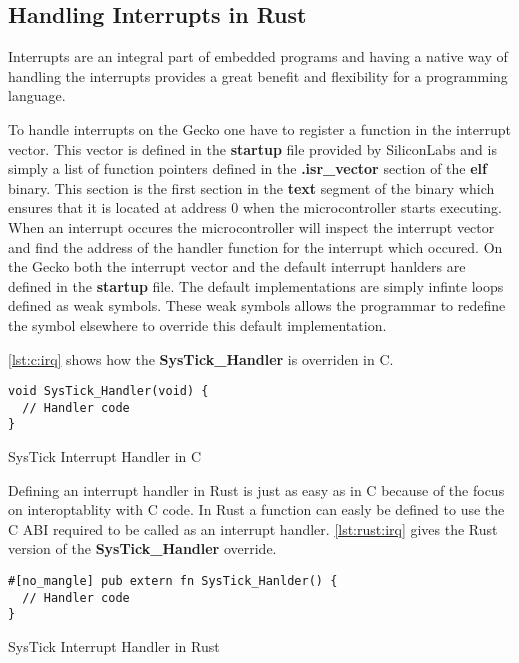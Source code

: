 \subsection{Handling Interrupts in Rust}
\label{sec:impl:handling-interrupts}

Interrupts are an integral part of embedded programs and having a native way of handling the interrupts provides a great benefit and flexibility for a programming language.

To handle interrupts on the Gecko one have to register a function in the interrupt vector.
This vector is defined in the \textbf{startup} file provided by SiliconLabs and is simply a list of function pointers defined in the \textbf{.isr\_vector} section of the \textbf{elf} binary.
This section is the first section in the \textbf{text} segment of the binary which ensures that it is located at address 0 when the microcontroller starts executing.
When an interrupt occures the microcontroller will inspect the interrupt vector and find the address of the handler function for the interrupt which occured.
On the Gecko both the interrupt vector and the default interrupt hanlders are defined in the \textbf{startup} file.
The default implementations are simply infinte loops defined as weak symbols.
These weak symbols allows the programmar to redefine the symbol elsewhere to override this default implementation.

\autoref{lst:c:irq} shows how the \textbf{SysTick\_Handler} is overriden in C.

\begin{listing}[H]
  \begin{verbatim}
void SysTick_Handler(void) {
  // Handler code
}
  \end{verbatim}
  \caption{SysTick Interrupt Handler in C}
  \label{lst:c:irq}
\end{listing}

Defining an interrupt handler in Rust is just as easy as in C because of the focus on interoptablity with C code.
In Rust a function can easly be defined to use the C ABI required to be called as an interrupt handler.
\autoref{lst:rust:irq} gives the Rust version of the \textbf{SysTick\_Handler} override.

\begin{listing}[H]
  \begin{verbatim}
#[no_mangle] pub extern fn SysTick_Hanlder() {
  // Handler code
}
  \end{verbatim}
  \caption{SysTick Interrupt Handler in Rust}
  \label{lst:rust:irq}
\end{listing}
